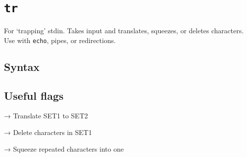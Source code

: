     
    
    

    
    \section{\texorpdfstring{\texttt{tr}}{tr}}\label{tr}

For `trapping' stdin. Takes input and translates, squeezes, or deletes
characters. Use with \texttt{echo}, pipes, or redirections.

    \subsection{Syntax}\label{syntax}

\begin{Shaded}
\begin{Highlighting}[]
 \PreprocessorTok{[}\PreprocessorTok{]}\PreprocessorTok{[}\PreprocessorTok{]}
\end{Highlighting}
\end{Shaded}

    \subsection{Useful flags}\label{useful-flags}

\begin{Shaded}
\begin{Highlighting}[]
\KeywordTok{(}\KeywordTok{)}
\end{Highlighting}
\end{Shaded}

→ Translate SET1 to SET2

\begin{Shaded}
\begin{Highlighting}[]
 
\end{Highlighting}
\end{Shaded}

→ Delete characters in SET1

\begin{Shaded}
\begin{Highlighting}[]
 
\end{Highlighting}
\end{Shaded}

→ Squeeze repeated characters into one

